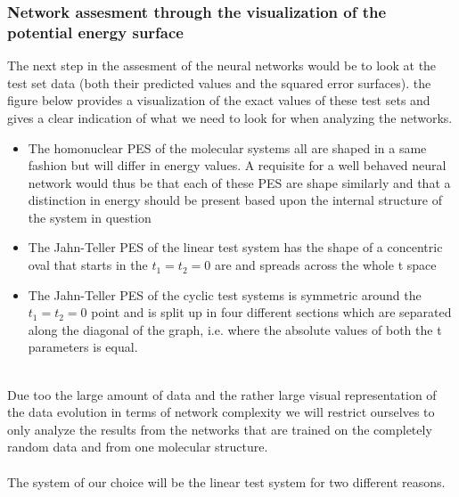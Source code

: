 \documentclass[]{article}
\begin{document}
\subsubsection{Network assesment through the visualization of the potential energy surface}

The next step in the assesment of the neural networks would be to look at the test set data (both their predicted values and the squared error surfaces). the figure below provides a visualization of the exact values of these test sets and gives a clear indication of what we need to look for when analyzing the networks.
\begin{itemize}
\item The homonuclear PES of the molecular systems all are shaped in a same fashion but will differ in energy values. A requisite for a well behaved neural network would thus be that each of these PES are shape similarly and that a distinction in energy should be present based upon the internal structure of the system in question
\item The Jahn-Teller PES of the linear test system has the shape of a concentric oval that starts in the $t_1=t_2=0$ are and spreads across the whole t space
\item The Jahn-Teller PES of the cyclic test systems is symmetric around the $t_1=t_2=0$ point and is split up in four different sections which are separated along the diagonal of the graph, i.e. where the absolute values of both the t parameters is equal.
\end{itemize}
\\
Due too the large amount of data and the rather large visual representation of the data evolution in terms of network complexity we will restrict ourselves to only analyze the results from the networks that are trained on the completely random data and from one molecular structure. 
\\
\\
The system of our choice will be the linear test system for two different reasons.
\end{document}
